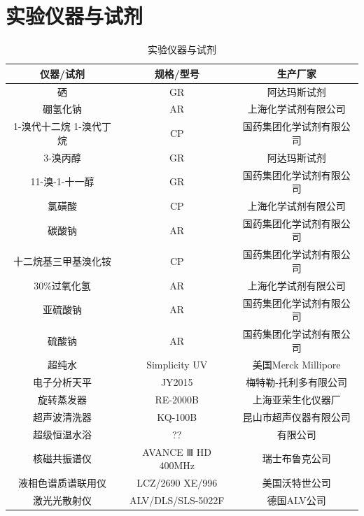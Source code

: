 \documentclass[bachelor,fandolfonts,replaceperiod]{jnuthesis}
\begin{document}
    \section{实验仪器与试剂}
        \begin{table}[htp]
        \centering
        \begin{tabular}{ccc}
            \toprule
            \textbf{仪器/试剂} & \textbf{规格/型号} & \textbf{生产厂家} \\
            \midrule
            硒   & GR & 阿达玛斯试剂 \\
            硼氢化钠  & AR  & 上海化学试剂有限公司 \\
            1-溴代十二烷
            1-溴代丁烷  & CP & 国药集团化学试剂有限公司 \\
            3-溴丙醇 & GR & 阿达玛斯试剂 \\
            11-溴-1-十一醇 & GR & 国药集团化学试剂有限公司 \\
            氯磺酸  & CP & 上海化学试剂有限公司 \\
            碳酸钠  & AR & 国药集团化学试剂有限公司 \\
            十二烷基三甲基溴化铵 & CP & 国药集团化学试剂有限公司\\
            30\%过氧化氢  & AR & 上海化学试剂有限公司 \\
            亚硫酸钠  & AR & 国药集团化学试剂有限公司 \\
            硫酸钠  & AR & 国药集团化学试剂有限公司 \\
            超纯水 & Simplicity\ce{^{\textregistered}} UV & 美国Merck Millipore\\
            电子分析天平  & JY2015 & 梅特勒-托利多有限公司 \\
            旋转蒸发器  & RE-2000B & 上海亚荣生化仪器厂 \\
            超声波清洗器  & KQ-100B & 昆山市超声仪器有限公司 \\
            超级恒温水浴  & ?? & 有限公司 \\
            核磁共振谱仪  & AVANCE Ⅲ HD 400MHz & 瑞士布鲁克公司 \\
            液相色谱质谱联用仪  & LCZ/2690 XE/996 & 美国沃特世公司 \\
            激光光散射仪 & ALV/DLS/SLS-5022F & 德国ALV公司\\
            \bottomrule
        \end{tabular}
        \caption{实验仪器与试剂}\label{table:实验仪器与试剂}
    \end{table}
    
\end{document}
